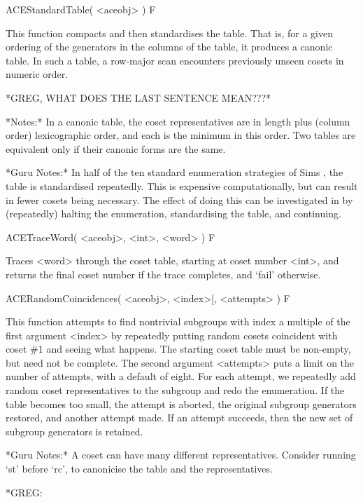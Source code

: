 \>ACEStandardTable( <aceobj> ) F

This function compacts and then standardises the table.
That is, for a given ordering of the generators in the columns of the
table, it produces a canonic table.
In such a table, a row-major scan encounters previously unseen cosets in
numeric order.

*GREG, WHAT DOES THE LAST SENTENCE MEAN???*

*Notes:*
In a canonic table, the coset representatives are in length plus (column
order) lexicographic order, and each is the minimum in this order.
Two tables are equivalent only if their canonic forms are the same.

*Guru Notes:*
In half of the ten standard enumeration strategies of Sims \cite{Sim},
the   table   is   standardised   repeatedly.    This   is   expensive
computationally, but can result  in fewer cosets being necessary.  The
effect of  doing this  can be investigated  in {\ACE}  by (repeatedly)
halting the enumeration, standardising the table, and continuing.

\>ACETraceWord( <aceobj>, <int>, <word> ) F

Traces <word> through the coset table, starting at coset number <int>,
and returns the final coset number if the trace completes,
and `fail' otherwise.


\>ACERandomCoincidences( <aceobj>, <index>[, <attempts> ) F

This function attempts  to  find  nontrivial subgroups  with  index  a
multiple  of the first  argument <index> by  repeatedly putting  random
cosets
coincident with coset \#1 and seeing what happens.  The starting coset
table  must  be non-empty,  but  need  not  be complete.   The  second
argument <attempts> puts  a limit on  the number of  attempts,
with a  default of
eight.    For   each  attempt,   we   repeatedly   add  random   coset
representatives  to the  subgroup and  redo the  enumeration.   If the
table becomes too small, the attempt is aborted, the original subgroup
generators  restored,  and  another   attempt  made.   If  an  attempt
succeeds, then the new set of subgroup generators is retained.

*Guru  Notes:*  A  coset  can  have  many  different  representatives.
Consider running  `st' before  `rc', to canonicise  the table  and the
representatives.



\begintt
*GREG:

